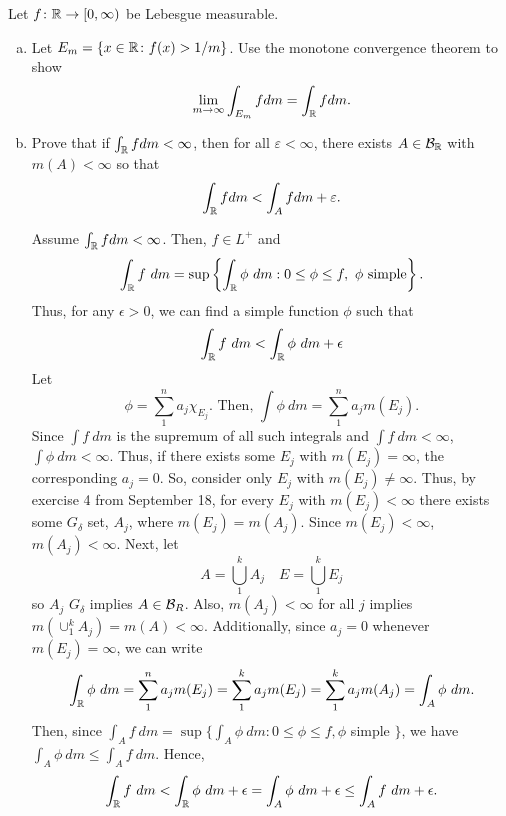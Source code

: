 \begin{list}
\begin{pf}
\end{pf}

\item Let $f \colon {\mathbb R} \rightarrow [0, \infty)$ be Lebesgue measurable. 
\begin{enumerate}[(a)] %
\item Let $E_m=\{ x \in {\mathbb R} \colon f(x)> 1/m \}$. Use the monotone convergence theorem to show
\begin{equation*}
 \lim_{m \rightarrow \infty} \int_{E_m} f dm = \int_{{\mathbb R}} f dm.
\end{equation*}
\begin{pf}
	
\end{pf}
\item Prove that if $\int_{\mathbb R} fdm<\infty$, then for all $\varepsilon < \infty$, there exists $A \in {\mathcal B}_{\mathbb R}$ with $m(A)<\infty$ so that  
\begin{equation*}
  \int_{{\mathbb R}} f dm < \int_{A} f dm + \varepsilon.
\end{equation*}
\begin{pf}
	Assume $\int_{\mathbb R} fdm<\infty$. Then, $f \in L^+$ and \[
	\int_{\mathbb R} f \ d m = \sup \left\{ \int_{\mathbb R}  \phi\ d m : 0 \leq \phi \leq f, \ \phi \text{ simple} \right\}.
	\] 
	Thus, for any $\epsilon>0$, we can find a simple function $\phi$ such that \[
	 \int_{\mathbb R} f \ dm < \int_{\mathbb R} \phi \ dm + \epsilon 
	\]
	 Let \[
	\phi = \sum_1^n a_j \chi_{E_j}. \text{ Then, } \int \phi \ dm = \sum_1^n a_j m(E_j).
	\]
	Since $\int f \ dm $ is the supremum of all such integrals and $\int f \ dm < \infty$, $\int \phi \ dm < \infty$. Thus, if there exists some $E_j$ with $m(E_j) = \infty$, the corresponding $a_j = 0$. So, consider only $E_j$ with $m(E_j) \neq \infty$. Thus, by exercise 4 from September 18, for every $E_j$ with $m(E_j)< \infty$ there exists some $G_{\delta}$ set, $A_j$, where $m(E_j)=m(A_j)$. Since $m(E_j)< \infty$, $m(A_j) < \infty$. Next, let
	\[
	A= \bigcup_1^k A_j \quad E = \bigcup_1^k E_j
	\]
	so $A_j$ $G_\delta$ implies $A \in {\mathcal B}_R$. Also, $m(A_j) < \infty$ for all $j$ implies $m(\cup_1^k A_j) = m(A) < \infty$.  Additionally, since $a_j = 0$ whenever $m(E_j) = \infty$, we can write
	\[
	 \int_\R \phi \ dm = \sum_1^n a_j m(E_j) = \sum_1^k a_j m(E_j) = \sum_1^k a_j m(A_j)= \int_A \phi \ dm.
	\]
	Then, since $\int_A f \ dm = \sup \{ \int_A \phi \ dm : 0 \leq \phi \leq f, \phi $ simple $ \}$, we have $\int_A \phi \ dm \leq \int_A f \ dm$. Hence, 
	\[
	 \int_\R f \ dm < \int_\R \phi \ dm + \epsilon = \int_A \phi \ dm + \epsilon \leq \int_A f \ dm + \epsilon. 
	\]


\end{pf}
\end{enumerate}
\end{list}
